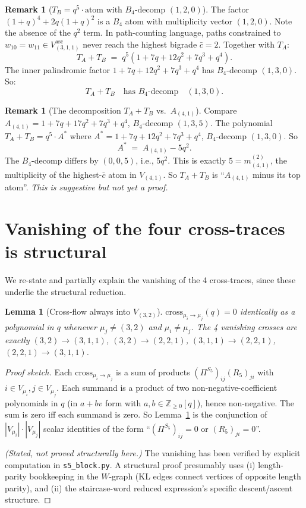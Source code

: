\documentclass[11pt]{article}
\newtheorem{lemma}[theorem]{Lemma}
\theoremstyle{definition}
\newtheorem{remark}[theorem]{Remark}
\begin{document}
\begin{remark}[$T_B = q^5 \cdot \text{atom with $B_4$-decomp $(1, 2, 0)$}$]\label{rem:TB}
The factor $(1+q)^4 + 2q(1+q)^2$ is a $B_4$ atom with multiplicity vector $(1, 2, 0)$. Note the absence of the $q^2$ term. In path-counting language, paths constrained to $w_{10} = w_{11} \in V_{(3,1,1)}^{\mathrm{asc}}$ never reach the highest bigrade $\bar c = 2$. Together with $T_A$:
\[
T_A + T_B \;=\; q^5(1 + 7q + 12q^2 + 7q^3 + q^4).
\]
The inner palindromic factor $1 + 7q + 12q^2 + 7q^3 + q^4$ has $B_4$-decomp $(1, 3, 0)$. So:
\[
T_A + T_B \quad\text{has $B_4$-decomp}\quad (1, 3, 0).
\]
\end{remark}

\begin{remark}[The decomposition $T_A + T_B$ vs.\ $A_{(4,1)}$]\label{rem:vs41}
Compare $A_{(4,1)} = 1 + 7q + 17q^2 + 7q^3 + q^4$, $B_4$-decomp $(1, 3, 5)$. The polynomial $T_A + T_B = q^5 \cdot A^*$ where $A^* = 1 + 7q + 12q^2 + 7q^3 + q^4$, $B_4$-decomp $(1, 3, 0)$. So
\[
A^* \;=\; A_{(4,1)} - 5 q^2.
\]
The $B_4$-decomp differs by $(0, 0, 5)$, i.e., $5 q^2$. This is exactly $5 = m_{(4,1)}^{(2)}$, the multiplicity of the highest-$\bar c$ atom in $V_{(4,1)}$. So $T_A + T_B$ is ``$A_{(4,1)}$ minus its top atom''. \emph{This is suggestive but not yet a proof.}
\end{remark}

\section{Vanishing of the four cross-traces is structural}\label{sec:vanishing}

We re-state and partially explain the vanishing of the 4 cross-traces, since these underlie the structural reduction.

\begin{lemma}[Cross-flow always into $V_{(3,2)}$]\label{lem:vanishing}
$\mathrm{cross}_{\mu_i \to \mu_j}(q) = 0$ identically as a polynomial in $q$ whenever $\mu_j \neq (3,2)$ and $\mu_i \neq \mu_j$. The 4 vanishing crosses are exactly $(3,2)\!\to\!(3,1,1)$, $(3,2)\!\to\!(2,2,1)$, $(3,1,1)\!\to\!(2,2,1)$, $(2,2,1)\!\to\!(3,1,1)$.
\end{lemma}

\begin{proof}[Proof sketch]
Each $\mathrm{cross}_{\mu_i \to \mu_j}$ is a sum of products $(\Pi^{S_5})_{ij} (R_5)_{ji}$ with $i \in V_{\mu_i}, j \in V_{\mu_j}$. Each summand is a product of two non-negative-coefficient polynomials in $q$ (in $a + bv$ form with $a, b \in \mathbb{Z}_{\geq 0}[q]$), hence non-negative. The sum is zero iff each summand is zero. So Lemma~\ref{lem:vanishing} is the conjunction of $|V_{\mu_i}| \cdot |V_{\mu_j}|$ scalar identities of the form ``$(\Pi^{S_5})_{ij} = 0$ or $(R_5)_{ji} = 0$''.

\textit{(Stated, not proved structurally here.)} The vanishing has been verified by explicit computation in \texttt{s5\_block.py}. A structural proof presumably uses (i) length-parity bookkeeping in the $W$-graph (KL edges connect vertices of opposite length parity), and (ii) the staircase-word reduced expression's specific descent/ascent structure. \qedhere
\end{proof}
\end{document}
